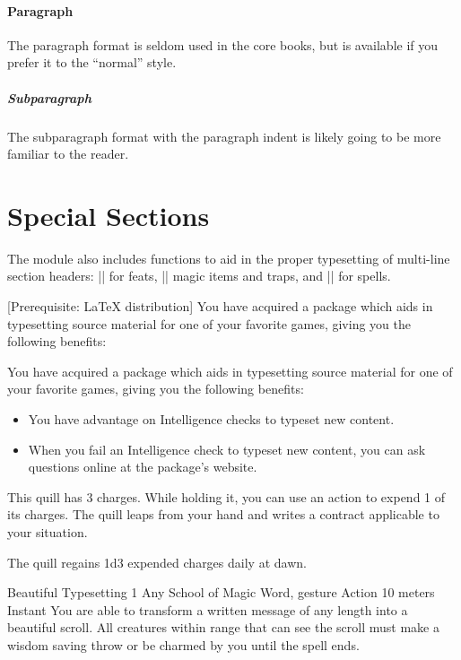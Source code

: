 \documentclass[letterpaper,twocolumn,openany,nodeprecatedcode]{dndbook}
\begin{document}
\paragraph{Paragraph}
The paragraph format is seldom used in the core books, but is available if you prefer it to the ``normal'' style.

\subparagraph{Subparagraph}
The subparagraph format with the paragraph indent is likely going to be more familiar to the reader.

\section{Special Sections}
The module also includes functions to aid in the proper typesetting of multi-line section headers: |\DndFeatHeader| for feats, |\DndItemHeader| magic items and traps, and |\DndSpellHeader| for spells.

[Prerequisite: \LaTeX{} distribution]
You have acquired a package which aids in typesetting source material for one of your favorite games, giving you the following benefits:



You have acquired a package which aids in typesetting source material for one of your favorite games, giving you the following benefits:

\begin{itemize}
  \item You have advantage on Intelligence checks to typeset new content.
  \item When you fail an Intelligence check to typeset new content, you can ask questions online at the package's website.
\end{itemize}

This quill has 3 charges. While holding it, you can use an action to expend 1 of its charges. The quill leaps from your hand and writes a contract applicable to your situation.

The quill regains 1d3 expended charges daily at dawn.

\DoDSpellHeader%
    {Beautiful Typesetting}
    {1}
    {Any School of Magic}
    {Word, gesture}
    {Action}
    {10 meters}
    {Instant}
You are able to transform a written message of any length into a beautiful scroll. All creatures within range that can see the scroll must make a wisdom saving throw or be charmed by you until the spell ends.
\end{document}
